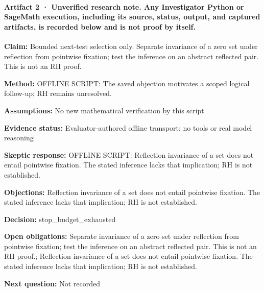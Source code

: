 \documentclass[11pt]{article}
\begin{document}
\paragraph{Artifact 2 · Unverified research note. Any Investigator Python or SageMath execution, including its source, status, output, and captured artifacts, is recorded below and is not proof by itself.}
\textbf{Claim:} Bounded next-test selection only. Separate invariance of a zero set under reflection from pointwise fixation; test the inference on an abstract reflected pair. This is not an RH proof.\par
\textbf{Method:} OFFLINE SCRIPT: The saved objection motivates a scoped logical follow-up; RH remains unresolved.\par
\textbf{Assumptions:} No new mathematical verification by this script\par
\textbf{Evidence status:} Evaluator-authored offline transport; no tools or real model reasoning\par
\textbf{Skeptic response:} OFFLINE SCRIPT: Reflection invariance of a set does not entail pointwise fixation. The stated inference lacks that implication; RH is not established.\par
\textbf{Objections:} Reflection invariance of a set does not entail pointwise fixation. The stated inference lacks that implication; RH is not established.\par
\textbf{Decision:} stop\_budget\_exhausted\par
\textbf{Open obligations:} Separate invariance of a zero set under reflection from pointwise fixation; test the inference on an abstract reflected pair. This is not an RH proof.; Reflection invariance of a set does not entail pointwise fixation. The stated inference lacks that implication; RH is not established.\par
\textbf{Next question:} Not recorded\par
\end{document}
